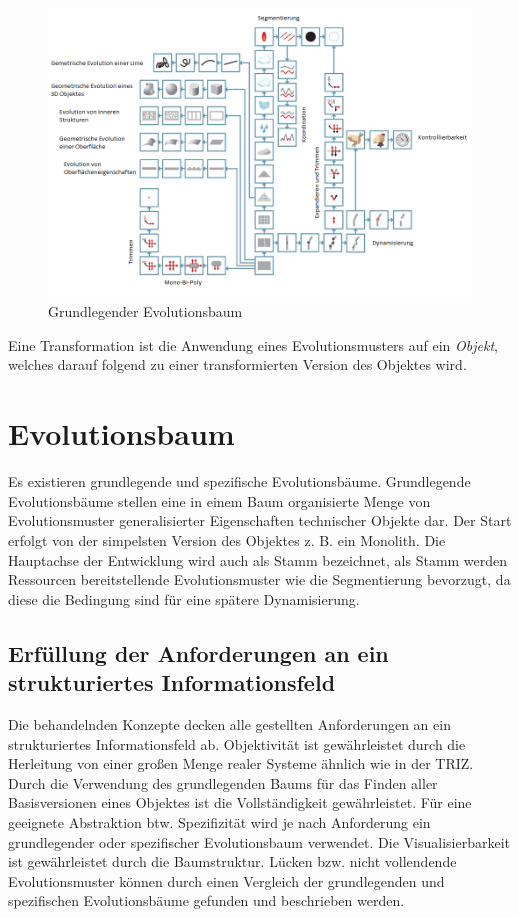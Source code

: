 \documentclass[11pt,a4paper]{article}
\begin{document}
\begin{figure}[htb]
  \centering
  \includegraphics[width=0.9\linewidth]{Basisevolutionsbaum2.png}
  \caption{\small Grundlegender Evolutionsbaum \cite{evo}}
  \label{fig:basic_evo}
\end{figure}

Eine Transformation ist die Anwendung eines Evolutionsmusters auf ein
\emph{Objekt}, welches darauf folgend zu einer transformierten Version des
Objektes wird.

\section{Evolutionsbaum}

Es existieren grundlegende und spezifische Evolutionsbäume. Grundlegende
Evolutionsbäume stellen eine in einem Baum organisierte Menge von
Evolutionsmuster generalisierter Eigenschaften technischer Objekte dar. Der
Start erfolgt von der simpelsten Version des Objektes z. B. ein Monolith. Die
Hauptachse der Entwicklung wird auch als Stamm bezeichnet, als Stamm werden
Ressourcen bereitstellende Evolutionsmuster wie die Segmentierung bevorzugt,
da diese die Bedingung sind für eine spätere Dynamisierung.


\subsection{Erfüllung der Anforderungen an ein strukturiertes Informationsfeld}

Die behandelnden Konzepte decken alle gestellten Anforderungen an ein
strukturiertes Informationsfeld ab. Objektivität ist gewährleistet durch die
Herleitung von einer großen Menge realer Systeme ähnlich wie in der
TRIZ. Durch die Verwendung des grundlegenden Baums für das Finden aller
Basisversionen eines Objektes ist die Vollständigkeit gewährleistet. Für eine
geeignete Abstraktion btw. Spezifizität wird je nach Anforderung ein
grundlegender oder spezifischer Evolutionsbaum verwendet. Die
Visualisierbarkeit ist gewährleistet durch die Baumstruktur. Lücken bzw. nicht
vollendende Evolutionsmuster können durch einen Vergleich der grundlegenden
und spezifischen Evolutionsbäume gefunden und beschrieben werden.
\end{document}
